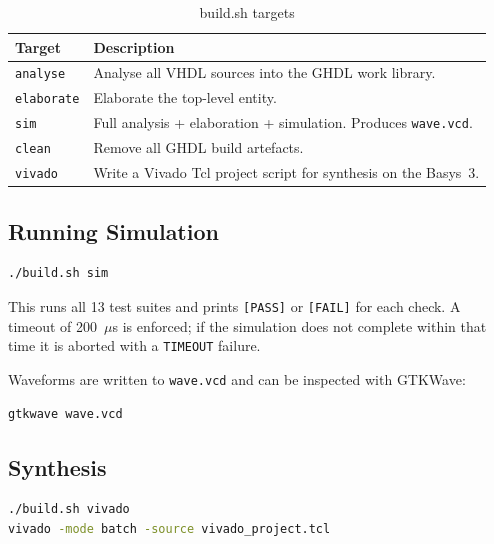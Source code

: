 \documentclass[a4paper,12pt]{report}
\begin{document}
\begin{table}[htbp]
\centering
\caption{build.sh targets}
\begin{tabularx}{\textwidth}{lX}
    \toprule
    \textbf{Target} & \textbf{Description} \\
    \midrule
    \texttt{analyse}   & Analyse all VHDL sources into the GHDL work library. \\
    \texttt{elaborate} & Elaborate the top-level entity. \\
    \texttt{sim}       & Full analysis + elaboration + simulation. Produces \texttt{wave.vcd}. \\
    \texttt{clean}     & Remove all GHDL build artefacts. \\
    \texttt{vivado}    & Write a Vivado Tcl project script for synthesis on the Basys~3. \\
    \bottomrule
\end{tabularx}
\end{table}

\subsection{Running Simulation}

\begin{lstlisting}[language=bash, basicstyle=\ttfamily\small, frame=single,
                   backgroundcolor=\color{codebg}]
./build.sh sim
\end{lstlisting}

This runs all 13 test suites and prints \texttt{[PASS]} or \texttt{[FAIL]} for each check. A timeout of 200~$\mu$s is enforced; if the simulation does not complete within that time it is aborted with a \texttt{TIMEOUT} failure.

Waveforms are written to \texttt{wave.vcd} and can be inspected with GTKWave:

\begin{lstlisting}[language=bash, basicstyle=\ttfamily\small, frame=single,
                   backgroundcolor=\color{codebg}]
gtkwave wave.vcd
\end{lstlisting}

\subsection{Synthesis}

\begin{lstlisting}[language=bash, basicstyle=\ttfamily\small, frame=single,
                   backgroundcolor=\color{codebg}]
./build.sh vivado
vivado -mode batch -source vivado_project.tcl
\end{lstlisting}
\end{document}
